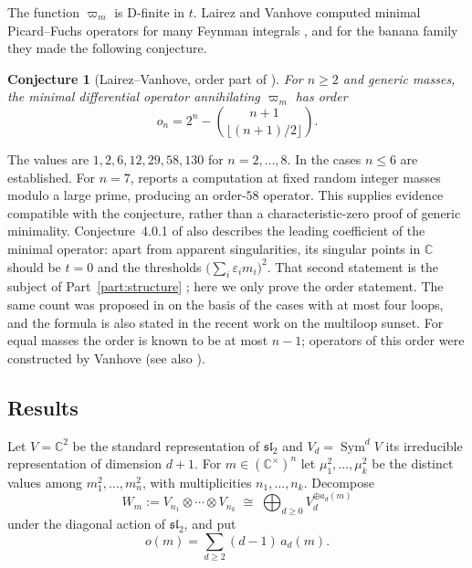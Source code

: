 \documentclass[11pt,a4paper]{article}
\newtheorem{conjecture}[theorem]{Conjecture}
\theoremstyle{definition}
\theoremstyle{remark}
\numberwithin{equation}{section}
\newcommand{\C}{\mathbb{C}}
\newcommand{\sltwo}{\mathfrak{sl}_2}
\DeclareMathOperator{\Sym}{Sym}
\begin{document}
The function $\varpi_m$ is D-finite in $t$. Lairez and Vanhove computed minimal Picard--Fuchs operators for many Feynman integrals \cite{LV23}, and for the banana family they made the following conjecture.

\begin{conjecture}[{Lairez--Vanhove, order part of \cite[Conj.~4.0.1]{LV23}}]\label{bo:conj:LV}
For $n\ge2$ and generic masses, the minimal differential operator annihilating $\varpi_m$ has order
\[
o_n=2^n-\binom{n+1}{\lfloor (n+1)/2\rfloor}.
\]
\end{conjecture}

The values are $1,2,6,12,29,58,130$ for $n=2,\dots,8$. In \cite[\S\S4.1--4.5]{LV23} the cases $n\le6$ are established. For $n=7$, \cite[\S4.6]{LV23} reports a computation at fixed random integer masses modulo a large prime, producing an order-$58$ operator. This supplies evidence compatible with the conjecture, rather than a characteristic-zero proof of generic minimality. Conjecture~4.0.1 of \cite{LV23} also describes the leading coefficient of the minimal operator: apart from apparent singularities, its singular points in $\C$ should be $t=0$ and the thresholds $\bigl(\sum_i\varepsilon_im_i\bigr)^2$. That second statement is the subject of Part~\ref{part:structure} ; here we only prove the order statement. The same count was proposed in \cite{BFKNS21} on the basis of the cases with at most four loops, and the formula is also stated in the recent work \cite[\S3.1]{Van26} on the multiloop sunset. For equal masses the order is known to be at most $n-1$; operators of this order were constructed by Vanhove \cite{Van14} (see also \cite{BS08,BSWZ12}).

\subsection{Results}
Let $V=\C^2$ be the standard representation of $\sltwo$ and $V_d=\Sym^dV$ its irreducible representation of dimension $d+1$. For $m\in(\C^\times)^n$ let $\mu_1^2,\dots,\mu_k^2$ be the distinct values among $m_1^2,\dots,m_n^2$, with multiplicities $n_1,\dots,n_k$. Decompose
\begin{equation}\label{bo:eq:W}
W_m:=V_{n_1}\otimes\cdots\otimes V_{n_k}\;\cong\;\bigoplus_{d\ge0}V_d^{\oplus a_d(m)}
\end{equation}
under the diagonal action of $\sltwo$, and put
\begin{equation}\label{bo:eq:o}
o(m)=\sum_{d\ge2}(d-1)\,a_d(m).
\end{equation}
\end{document}
